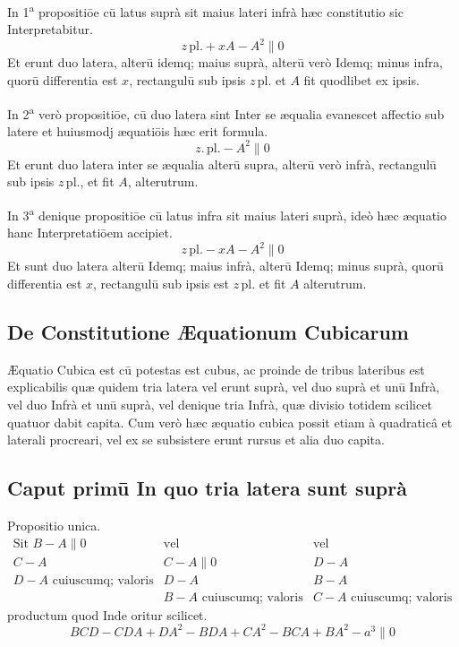 \documentclass[11pt,a4paper]{article}
\begin{document}
In 1\textsuperscript{a} propositiōe cū latus suprà sit maius lateri infrà hæc constitutio sic Interpretabitur.
\[ z\,\mathrm{pl.} + xA - A^{2} \parallel 0 \]
Et erunt duo latera, alterū idemq; maius suprà, alterū verò Idemq; minus infra, quorū differentia est $x$, rectangulū sub ipsis $z\,\mathrm{pl.}$ et $A$ fit quodlibet ex ipsis.

In 2\textsuperscript{a} verò propositiōe, cū duo latera sint Inter se æqualia evanescet affectio sub latere et huiusmodj æquatiōis hæc erit formula.
\[ z.\,\mathrm{pl.} - A^{2} \parallel 0 \]
Et erunt duo latera inter se æqualia alterū supra, alterū verò infrà, rectangulū sub ipsis $z\,\mathrm{pl.}$, et fit $A$, alterutrum.

In 3\textsuperscript{a} denique propositiōe cū latus infra sit maius lateri suprà, ideò hæc æquatio hanc Interpretatiōem accipiet.
\[ z\,\mathrm{pl.} - xA - A^{2} \parallel 0 \]
Et sunt duo latera alterū Idemq; maius infrà, alterū Idemq; minus suprà, quorū differentia est $x$, rectangulū sub ipsis est $z\,\mathrm{pl.}$ et fit $A$ alterutrum.


\subsection*{De Constitutione Æquationum Cubicarum}

Æquatio Cubica est cū potestas est cubus, ac proinde de tribus lateribus est explicabilis quæ quidem tria latera vel erunt suprà, vel duo suprà et unū Infrà, vel duo Infrà et unū suprà, vel denique tria Infrà, quæ divisio totidem scilicet quatuor dabit capita. Cum verò hæc æquatio cubica possit etiam à quadraticâ et laterali procreari, vel ex se subsistere erunt rursus et alia duo capita.

\subsection*{Caput primū In quo tria latera sunt suprà}

Propositio unica.
\[ \begin{array}{lll} \text{Sit } B - A \parallel 0 & \text{vel} & \text{vel} \\ C - A & C - A \parallel 0 & D - A \\ D - A \text{ cuiuscumq; valoris} & D - A & B - A \\ & B - A \text{ cuiuscumq; valoris} & C - A \text{ cuiuscumq; valoris} \end{array} \]
productum quod Inde oritur scilicet.
\[ BCD - CDA + DA^{2} - BDA + CA^{2} - BCA + BA^{2} - a^{3} \parallel 0 \]
\end{document}
